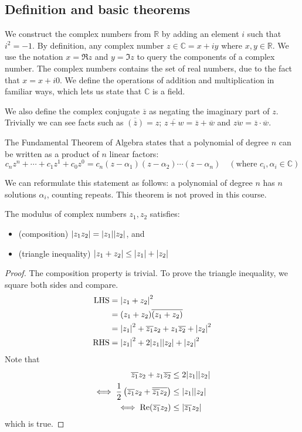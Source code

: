 \subsection{Definition and basic theorems}
We construct the complex numbers from \(\mathbb R\) by adding an element \(i\) such that \(i^2 = -1\).
By definition, any complex number \(z \in \mathbb C = x + iy\) where \(x, y \in \mathbb R\).
We use the notation \(x = \Re z\) and \(y = \Im z\) to query the components of a complex number.
The complex numbers contains the set of real numbers, due to the fact that \(x = x + i0\).
We define the operations of addition and multiplication in familiar ways, which lets us state that \(\mathbb C\) is a field.

We also define the complex conjugate \(\overline{z}\) as negating the imaginary part of \(z\).
Trivially we can see facts such as \(\overline{\left( \overline{z}\right) } = z\); \(\overline{z + w} = \overline z + \overline w\) and \(\overline{zw} = \overline z \cdot \overline w\).

The Fundamental Theorem of Algebra states that a polynomial of degree \(n\) can be written as a product of \(n\) linear factors:
\[
	c_n z^n + \cdots + c_1z^1 + c_0z^0 = c_n(z-\alpha_1)(z-\alpha_2) \cdots (z-\alpha_n)\quad (\text{where } c_i, \alpha_i \in \mathbb C)
\]

We can reformulate this statement as follows: a polynomial of degree \(n\) has \(n\) solutions \(\alpha_i\), counting repeats.
This theorem is not proved in this course.

The modulus of complex numbers \(z_1, z_2\) satisfies:
\begin{itemize}
	\item (composition) \(\abs{z_1 z_2} = \abs{z_1} \abs{z_2}\), and
	\item (triangle inequality) \(\abs{z_1 + z_2} \leq \abs{z_1} + \abs{z_2}\)
\end{itemize}
\begin{proof}
	The composition property is trivial.
	To prove the triangle inequality, we square both sides and compare.
	\begin{align*}
		\text{LHS} & = \abs{z_1 + z_2}^2                                                 \\
		           & = (z_1 + z_2)\overline{(z_1 + z_2)}                                 \\
		           & = \abs{z_1}^2 + \overline{z_1}z_2 + z_1\overline{z_2} + \abs{z_2}^2 \\
		\text{RHS} & = \abs{z_1}^2 + 2 \abs{z_1}\abs{z_2} + \abs{z_2}^2
	\end{align*}
	Note that
	\begin{align*}
		\overline{z_1}z_2 + z_1\overline{z_2}                                           & \leq 2 \abs{z_1}\abs{z_2}     \\
		\iff \frac{1}{2}\left( \overline{z_1}z_2 + \overline{\overline{z_1}z_2} \right) & \leq \abs{z_1}\abs{z_2}       \\
		\iff \operatorname{Re} (\overline{z_1} z_2)                                                   & \leq \abs{\overline{z_1} z_2}
	\end{align*}
	which is true.
\end{proof}

